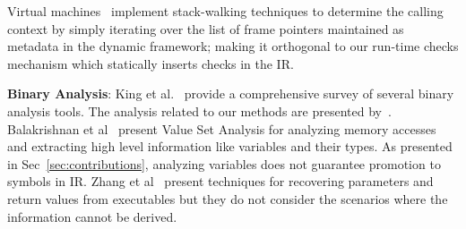 Virtual machines~\cite{jalapeno-vm} implement stack-walking techniques to determine the calling context by simply iterating over the list of frame pointers maintained as metadata in the dynamic framework; making it orthogonal to our run-time checks mechanism which statically inserts checks in the IR.

\textbf{Binary Analysis}: King et al.~\cite{dagstuhl-reports-KingMRS12} provide a comprehensive survey of several binary analysis tools. The analysis related to our methods are presented by~\cite{paramRetVal07,gogul04,reps06}. Balakrishnan et al~\cite{gogul04,reps06} present Value Set Analysis for analyzing memory accesses and extracting high level information like variables and their types. As presented in Sec~\ref{sec:contributions}, analyzing variables does not guarantee promotion to symbols in IR. Zhang et al~\cite{paramRetVal07} present techniques for recovering parameters and return values from executables but they do not consider the scenarios where the information cannot be derived.

